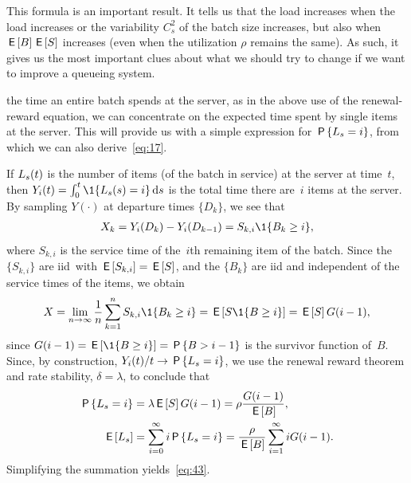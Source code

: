\documentclass[queueing-book.tex]{subfiles}
\begin{document}
This formula is an important result.
It tells us that the load increases when the load increases or the variability $C_{s}^{2}$ of the batch size increases, but also when $\,\mathsf{E}\left[B\right] \,\mathsf{E}\left[S\right]$ increases (even when the utilization $\rho$ remains the same). As such, it gives us the most important clues about  what we should try to change if we want to improve a queueing system.

 the time an entire batch spends at the server, as in the above use of the renewal-reward equation, we can
concentrate on the expected time spent by single items at the server.
This will provide us with a simple expression for $\,\mathsf{P}\left\{L_s=i\right\}$, from which we can also derive~\cref{eq:17}.

If $L_s(t)$ is the number of items (of the batch in service) at the server at time~$t$, then $Y_i(t) = \int_0^t \1{\Ls(s)=i} \d s$ is the total time there are~$i$ items at the server.
By sampling $Y(\cdot)$ at departure times $\{D_k\}$, we see that
\begin{align*}
X_k = Y_i(D_k) - Y_i(D_{k-1}) = S_{k,i} \1{B_{k} \geq i},
\end{align*}
where $S_{k,i}$ is the service time of the~$i$th remaining item of the batch.
Since the $\{S_{k, i}\}$ are iid\ with $\,\mathsf{E}\left[S_{k,i}\right] = \,\mathsf{E}\left[S\right]$, and the $\{B_k\}$ are iid and independent of the service times of the items, we obtain
 \begin{equation*}
X = \lim_{n\to\infty} \frac{1}{n}\sum_{k=1}^n S_{k,i} \1{B_{k} \geq i} = \E{S \1{B\geq i}} = \E S G(i-1),
 \end{equation*}
since $G(i-1) = \E{\1{B\geq i}} = \P{B> i-1}$ is the survivor function of~$B$.
Since, by construction, $Y_i(t)/t \to \,\mathsf{P}\left\{L_s=i\right\}$,   we use the renewal reward theorem and rate stability, $\delta = \lambda$, to conclude that
 \begin{align*}
 \,\mathsf{P}\left\{L_s = i\right\} &= \lambda \,\mathsf{E}\left[S\right] G(i-1) = \rho \frac{G(i-1)}{\,\mathsf{E}\left[B\right]}, \\
 \,\mathsf{E}\left[L_s\right] &= \sum_{i=0}^\infty i \,\mathsf{P}\left\{L_s=i\right\} = \frac{\rho}{\,\mathsf{E}\left[B\right]} \sum_{i=1}^\infty i G(i-1).
\end{align*}
Simplifying  the summation yields~\cref{eq:43}.
\end{document}
